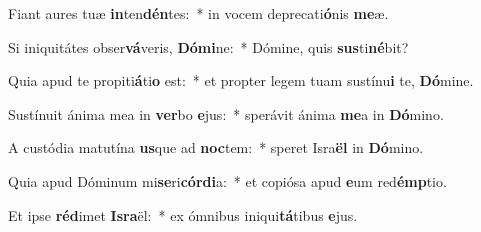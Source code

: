 \item Fiant aures tuæ \textbf{in}ten\textbf{dén}tes:~* in vocem deprecati\textbf{ó}nis \textbf{me}æ.
\item Si iniquitátes obser\textbf{vá}veris, \textbf{Dó}\textbf{mi}ne:~* Dómine, quis \textbf{sus}ti\textbf{né}bit?
\item Quia apud te propiti\textbf{á}ti\textbf{o} est:~* et propter legem tuam sustínu\textbf{i} te, \textbf{Dó}mine.
\item Sustínuit ánima mea in \textbf{ver}bo \textbf{e}jus:~* sperávit ánima \textbf{me}a in \textbf{Dó}mino.
\item A custódia matutína \textbf{us}que ad \textbf{noc}tem:~* speret Isra\textbf{ël} in \textbf{Dó}mino.
\item Quia apud Dóminum mi\textbf{se}ri\textbf{cór}\textbf{di}a:~* et copiósa apud \textbf{e}um red\textbf{émp}tio.
\item Et ipse \textbf{réd}imet \textbf{Is}\textbf{ra}ël:~* ex ómnibus iniqui\textbf{tá}tibus \textbf{e}jus.
